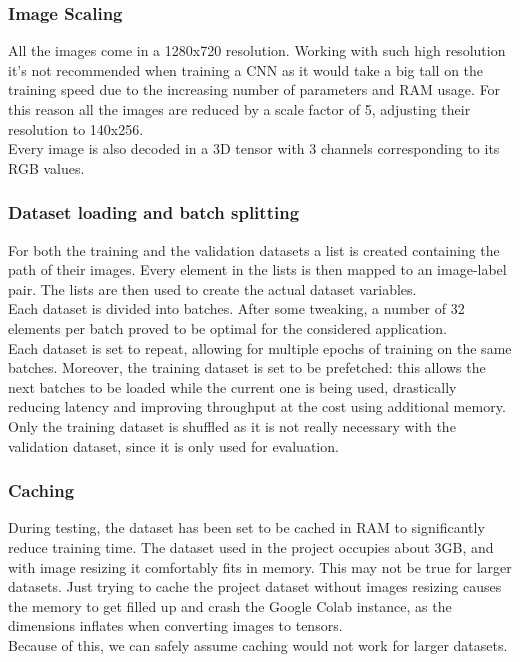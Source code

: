 \documentclass[a4paper,12pt]{article}
\begin{document}
\subsubsection{Image Scaling}
All the images come in a 1280x720 resolution. Working with such high resolution it's not 
recommended when training a CNN as it would take a big tall on the training speed due to the increasing number of parameters and RAM usage. 
For this reason all the images are reduced by a scale factor of 5, adjusting their resolution to 140x256.\\
Every image is also decoded in a 3D tensor with 3 channels corresponding to its RGB values.

\subsubsection{Dataset loading and batch splitting}
For both the training and the validation datasets a list is created containing the path of their images. 
Every element in the lists is then mapped to an image-label pair. The lists are then used to create the actual dataset variables.\\
Each dataset is divided into batches. After some tweaking, a number of 32 elements per batch proved to be optimal for the considered application.\\
Each dataset is set to repeat, allowing for multiple epochs of training on the same batches. Moreover, the training dataset is set to be prefetched: 
this allows the next batches to be loaded while the current one is being used, drastically reducing latency and improving throughput at the cost using additional memory.\\
Only the training dataset is shuffled as it is not really necessary with the validation dataset, since it is only used for evaluation.

\subsubsection{Caching}
During testing, the dataset has been set to be cached in RAM to significantly reduce training time. The dataset used in the project occupies about 3GB, and with image resizing it comfortably fits in memory. This may not be true for larger datasets. Just trying to cache the project dataset without images resizing causes the memory to get filled up and crash the Google Colab instance, as the dimensions inflates when converting images to tensors.\\
Because of this, we can safely assume caching would not work for larger datasets.
\end{document}
